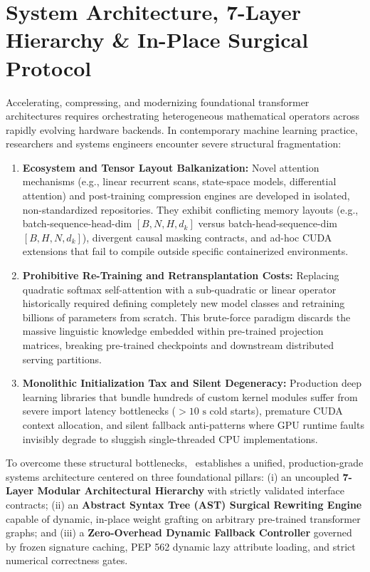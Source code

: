 
\section{System Architecture, 7-Layer Hierarchy \& In-Place Surgical Protocol}
\label{sec:system_architecture}

Accelerating, compressing, and modernizing foundational transformer architectures requires orchestrating heterogeneous mathematical operators across rapidly evolving hardware backends. In contemporary machine learning practice, researchers and systems engineers encounter severe structural fragmentation:
\begin{enumerate}
    \item \textbf{Ecosystem and Tensor Layout Balkanization:} Novel attention mechanisms (e.g., linear recurrent scans, state-space models, differential attention) and post-training compression engines are developed in isolated, non-standardized repositories. They exhibit conflicting memory layouts (e.g., batch-sequence-head-dim $[B, N, H, d_k]$ versus batch-head-sequence-dim $[B, H, N, d_k]$), divergent causal masking contracts, and ad-hoc CUDA extensions that fail to compile outside specific containerized environments.
    \item \textbf{Prohibitive Re-Training and Retransplantation Costs:} Replacing quadratic softmax self-attention with a sub-quadratic or linear operator historically required defining completely new model classes and retraining billions of parameters from scratch. This brute-force paradigm discards the massive linguistic knowledge embedded within pre-trained projection matrices, breaking pre-trained checkpoints and downstream distributed serving partitions.
    \item \textbf{Monolithic Initialization Tax and Silent Degeneracy:} Production deep learning libraries that bundle hundreds of custom kernel modules suffer from severe import latency bottlenecks ($>10\text{ s}$ cold starts), premature CUDA context allocation, and silent fallback anti-patterns where GPU runtime faults invisibly degrade to sluggish single-threaded CPU implementations.
\end{enumerate}

To overcome these structural bottlenecks, \neuralops\ establishes a unified, production-grade systems architecture centered on three foundational pillars: (i) an uncoupled \textbf{7-Layer Modular Architectural Hierarchy} with strictly validated interface contracts; (ii) an \textbf{Abstract Syntax Tree (AST) Surgical Rewriting Engine} capable of dynamic, in-place weight grafting on arbitrary pre-trained transformer graphs; and (iii) a \textbf{Zero-Overhead Dynamic Fallback Controller} governed by frozen signature caching, PEP 562 dynamic lazy attribute loading, and strict numerical correctness gates.

